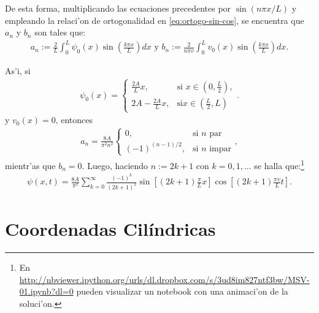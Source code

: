 De esta forma, multiplicando las ecuaciones precedentes por $\sin(n\pi x/L)$ y empleando la relaci'on de ortogonalidad en \eqref{eq:ortogo-sin-cos}, se encuentra que $a_{n}$ y $b_{n}$ son tales que:
\begin{align}
a_{n}:=\frac{2}{L}\int_{0}^{L} \psi_{0}(x)\sin\left(\frac{k\pi x}{L}\right)dx \text{  y  }
b_{n}:=\frac{2}{n \pi v}\int_{0}^{L} v_{0}(x)\sin\left(\frac{k\pi x}{L}\right)dx.
\end{align}

As'i, si
\begin{align}
\psi_{0}(x)=
\begin{cases}
\frac{2A}{L}x, &\text{si }x \in (0,\frac{L}{2}),\\
2A-\frac{2A}{L}x, &\text{si}x \in (\frac{L}{2},L)
\end{cases} .
\end{align}
y $v_{0}(x)=0$, entonces
\begin{align}
a_{n}=\frac{8A}{\pi^2 n^2}
\begin{cases}
0, &\text{si }n \text{ par}\\
(-1)^{(n-1)/2}, &\text{si }n \text{ impar}
\end{cases},
\end{align}
mientr'as que $b_{n}=0$. Luego, haciendo $n:=2k+1$ con $k=0,1,\hdots$ se halla que:\footnote{En \url{http://nbviewer.ipython.org/urls/dl.dropbox.com/s/3ud8im827ntf3bw/MSV-01.ipynb?dl=0} pueden visualizar un notebook con una animaci'on de la soluci'on.}
\begin{align}
\psi(x,t)=\frac{8A}{\pi^2}\sum_{k=0}^{\infty}\frac{(-1)^k}{(2k+1)^2}\sin\left[(2k+1)\frac{\pi}{L}x\right]\cos\left[(2k+1)\frac{\pi v}{L}t\right].
\end{align}
\section{Coordenadas Cil\'indricas}
